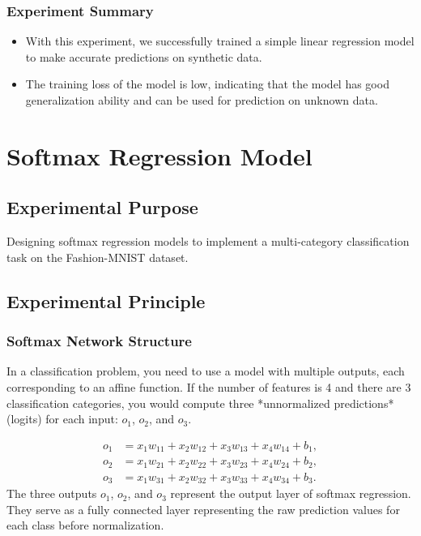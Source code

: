 \documentclass[a4paper,12pt]{article}
\begin{document}
\subsubsection{Experiment Summary}


\begin{itemize}
  \item With this experiment, we successfully trained a simple linear regression model to make accurate predictions on synthetic data.
  \item The training loss of the model is low, indicating that the model has good generalization ability and can be used for prediction on unknown data.
\end{itemize}
   
\newpage
\section{Softmax Regression Model}
\subsection{Experimental Purpose}
Designing softmax regression models to implement a multi-category classification task on the Fashion-MNIST dataset.
\subsection{Experimental Principle}
\subsubsection{Softmax Network Structure}
In a classification problem, you need to use a model with multiple outputs, each corresponding to an affine function. If the number of features is 4 and there are 3 classification categories, you would compute three *unnormalized predictions* (logits) for each input: \( o_1 \), \( o_2 \), and \( o_3 \).

\begin{equation}
\begin{split}
o_1 &= x_1w_{11} + x_2w_{12} + x_3w_{13} + x_4w_{14} + b_1, \\
o_2 &= x_1w_{21} + x_2w_{22} + x_3w_{23} + x_4w_{24} + b_2, \\
o_3 &= x_1w_{31} + x_2w_{32} + x_3w_{33} + x_4w_{34} + b_3.
\end{split}
\end{equation}
The three outputs \( o_1 \), \( o_2 \), and \( o_3 \) represent the output layer of softmax regression. They serve as a fully connected layer representing the raw prediction values for each class before normalization.
\end{document}
